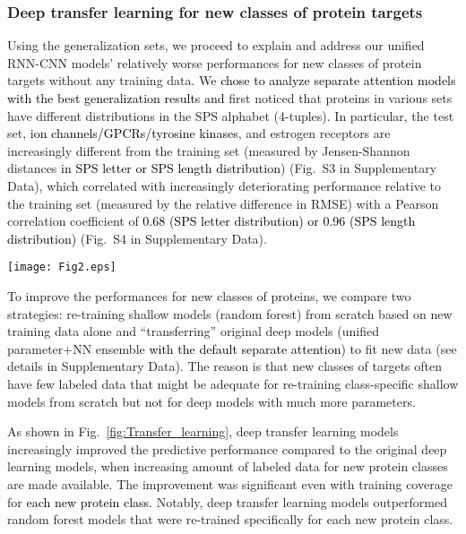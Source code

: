 \documentclass[nocrop]{bioinfo}
\newcommand{\red}[1]{\textcolor{black}{#1}}
\begin{document}
\vspace{-1em}
\subsubsection{Deep transfer learning for new classes of protein targets} 

Using the generalization sets, we proceed to explain and address our unified RNN-CNN models' relatively worse performances for new classes of protein targets without any training data. We \red{chose to analyze separate attention models with the best generalization results and} first noticed that proteins in various sets have different distributions in the SPS alphabet (4-tuples). In particular, the test set, \red{ion channels/GPCRs/tyrosine kinases}, and estrogen receptors are increasingly different from the training set  (measured by Jensen-Shannon distances \red{in SPS letter or SPS length distribution}) (Fig.~S3 in Supplementary Data), which correlated with increasingly deteriorating performance relative to the training set  (measured by the relative difference in RMSE) with a Pearson correlation coefficient of \red{0.68 (SPS letter distribution) or 0.96 (SPS length distribution)} (Fig.~S4 in Supplementary Data).  

\begin{figure*}[!htb]
    \centering
\texttt{[image: Fig2.eps]}
    \caption{\red{Comparing  strategies to generalize predictions for four sets of new protein classes: original random forest (RF), original param.+NN ensemble of unified RNN-CNN models (DL for deep learning with the default attention), and re-trained RF or transfer DL using incremental amounts of labeled data in each set.}}
    \label{fig:Transfer_learning}
\end{figure*}
 
To improve the performances for new classes of proteins, we compare two strategies: re-training shallow models  (random forest) from scratch based on new training data alone and ``transferring'' original deep models  (unified parameter+NN ensemble \red{with the default separate attention}) to fit new data  (see details in Supplementary Data). The reason is that new classes of targets often have few labeled data that might be adequate for re-training class-specific shallow models from scratch but not for deep models with much more parameters. 




As shown in Fig.~\ref{fig:Transfer_learning}, deep transfer learning models increasingly improved the predictive performance compared to the original deep learning models, when increasing amount of labeled data for new protein classes are made available.  The improvement was significant even with   training coverage for \red{each new protein class.} Notably, deep transfer learning models outperformed random forest models that were re-trained specifically for each new protein class.  
\end{document}
